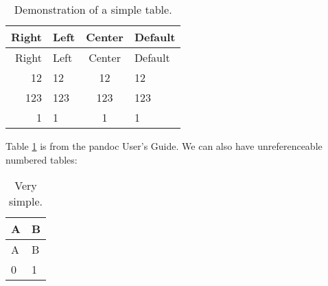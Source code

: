 \begin{longtable}[c]{@{}rlcl@{}}
\caption{Demonstration of a simple
table.\label{tbl:demo}}\tabularnewline
\toprule
Right & Left & Center & Default\tabularnewline
\midrule
\endfirsthead
\toprule
Right & Left & Center & Default\tabularnewline
\midrule
\endhead
12 & 12 & 12 & 12\tabularnewline
123 & 123 & 123 & 123\tabularnewline
1 & 1 & 1 & 1\tabularnewline
\bottomrule
\end{longtable}

Table \ref{tbl:demo} is from the pandoc User's Guide. We can also have
unreferenceable numbered tables:

\begin{longtable}[c]{@{}ll@{}}
\caption{Very
simple.\label{tbl:__-1650883463836839502__}}\tabularnewline
\toprule
A & B\tabularnewline
\midrule
\endfirsthead
\toprule
A & B\tabularnewline
\midrule
\endhead
0 & 1\tabularnewline
\bottomrule
\end{longtable}
